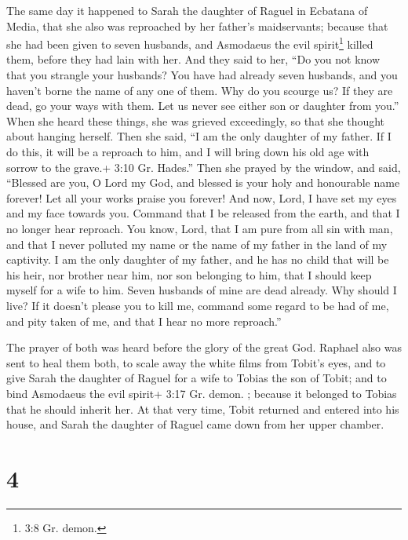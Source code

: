  The same day it happened to Sarah the daughter of Raguel in
Ecbatana of Media, that she also was reproached by her father's
maidservants;  because that she had been given to seven
husbands, and Asmodaeus the evil spirit\footnote{3:8 Gr. demon.} killed
them, before they had lain with her. And they said to her, ``Do you not
know that you strangle your husbands? You have had already seven
husbands, and you haven't borne the name of any one of them.
 Why do you scourge us? If they are dead, go your ways with
them. Let us never see either son or daughter from you.'' 
When she heard these things, she was grieved exceedingly, so that she
thought about hanging herself. Then she said, ``I am the only daughter
of my father. If I do this, it will be a reproach to him, and I will
bring down his old age with sorrow to the grave.+ 3:10 Gr. Hades.''
 Then she prayed by the window, and said, ``Blessed are
you, O Lord my God, and blessed is your holy and honourable name
forever! Let all your works praise you forever!  And now,
Lord, I have set my eyes and my face towards you.  Command
that I be released from the earth, and that I no longer hear reproach.
 You know, Lord, that I am pure from all sin with man,
 and that I never polluted my name or the name of my father
in the land of my captivity. I am the only daughter of my father, and he
has no child that will be his heir, nor brother near him, nor son
belonging to him, that I should keep myself for a wife to him. Seven
husbands of mine are dead already. Why should I live? If it doesn't
please you to kill me, command some regard to be had of me, and pity
taken of me, and that I hear no more reproach.''

 The prayer of both was heard before the glory of the great
God.  Raphael also was sent to heal them both, to scale
away the white films from Tobit's eyes, and to give Sarah the daughter
of Raguel for a wife to Tobias the son of Tobit; and to bind Asmodaeus
the evil spirit+ 3:17 Gr. demon. ; because it belonged to Tobias that he
should inherit her. At that very time, Tobit returned and entered into
his house, and Sarah the daughter of Raguel came down from her upper
chamber.

\hypertarget{section-3}{%
\section{4}\label{section-3}}

